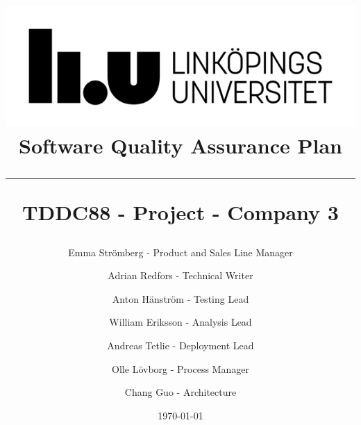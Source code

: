 \documentclass{article}
\title{
\includegraphics[scale=1.5]{liu_logga.png} \\
\vspace{2.0cm} \textbf{Software Quality Assurance Plan} \\
 \endgraf\rule{\textwidth}{.4pt}
  \large \textbf{TDDC88 - Project - Company 3}\\
}
\author{
    Emma Strömberg - Product and Sales Line Manager \and 
    Adrian Redfors - Technical Writer \and 
    Anton Hänström - Testing Lead \and 
    William Eriksson - Analysis Lead \and 
    Andreas Tetlie - Deployment Lead \and 
    Olle Lövborg - Process Manager \and 
    Chang Guo - Architecture
}
\date{\today}
\begin{document}

\end{document}

